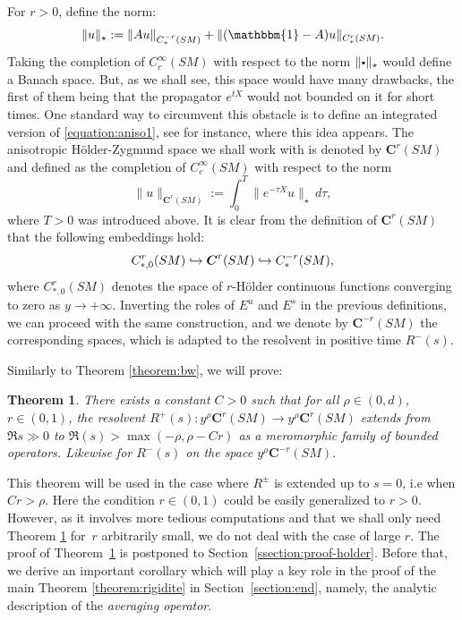 \documentclass[10pt]{amsart}
\newcommand\hto{\mathrel{\lhook\joinrel\to}}
\newcommand{\sbullet}{{\scriptscriptstyle\bullet}}
\newcommand{\csbullet}{{\raisebox{1pt}{$\sbullet$}}}
\newcommand{\bC}{\boldsymbol{C}}
\theoremstyle{plain}
\newtheorem{theorem}{Theorem}[section]
\theoremstyle{definition}
\begin{document}
For $r > 0$, define the norm:
\begin{equation}
\label{equation:aniso1}
\|u\|_{\star} := \|Au\|_{C^{-r}_*(SM)} + \|(\mathbbm{1}-A)u\|_{C^r_*(SM)}.
\end{equation}
Taking the completion of $C^\infty_{c}(SM)$ with respect to the norm $\|\csbullet\|_{\star}$ would define a Banach space. But, as we shall see, this space would have many drawbacks, the first of them being that the propagator $e^{tX}$ would not bounded on it for short times. One standard way to circumvent this obstacle is to define an integrated version of \eqref{equation:aniso1}, see \cite{Baladi-Tsujii-08,Adam-Baladi-21} for instance, where this idea appears. The anisotropic Hölder-Zygmund space we shall work with is denoted by $\bC^r(SM)$ and defined as the completion of $C^\infty_{c}(SM)$ with respect to the norm
\begin{equation}
\label{equation:aniso2}
\|u\|_{\bC^r(SM)} := \int_0^T \|e^{-\tau X}u\|_{\star}\, d\tau,
\end{equation}
where $T > 0$ was introduced above. It is clear from the definition of $\bC^r(SM)$ that the following embeddings hold:
\begin{equation}
\label{equation:embedding-plot2}
C^r_{*,0}(SM) \hto \bC^r(SM) \hto C^{-r}_*(SM),
\end{equation}
where $C^r_{*,0}(SM)$ denotes the space of $r$-Hölder continuous functions converging to zero as $y \to +\infty$. Inverting the roles of $E^u$ and $E^s$ in the previous definitions, we can proceed with the same construction, and we denote by $\bC^{-r}(SM)$ the corresponding spaces, which is adapted to the resolvent in positive time $R^-(s)$.

Similarly to Theorem \ref{theorem:bw}, we will prove:
\begin{theorem}
\label{thm:continuation-resolvent-holder}
There exists a constant $C>0$ such that for all $\rho \in (0,d)$, $r \in (0,1)$, the resolvent $R^+(s) : y^\rho \bC^r(SM) \to y^\rho \bC^r(SM)$ extends from $\Re s \gg 0$ to $\Re(s) > \max(-\rho,\rho-Cr)$ as a meromorphic family of bounded operators. {\color{black}Likewise for $R^-(s)$ on the space $y^\rho \bC^{-r}(SM)$.}
\end{theorem}

{\color{black}This theorem will be used in the case where $R^{\pm}$ is extended up to $s=0$, i.e when $Cr > \rho$.} Here the condition $r\in (0,1)$ could be easily generalized to $r>0$. However, as it involves more tedious computations and that we shall only need Theorem \ref{thm:continuation-resolvent-holder} for~$r$ arbitrarily small, we do not deal with the case of large $r$. The proof of Theorem~\ref{thm:continuation-resolvent-holder} is postponed to Section~\ref{ssection:proof-holder}. Before that, we derive an important corollary which will play a key role in the proof of the main Theorem \ref{theorem:rigidite} in Section~\ref{section:end}, namely, the analytic description of the \emph{averaging operator}.
\end{document}
